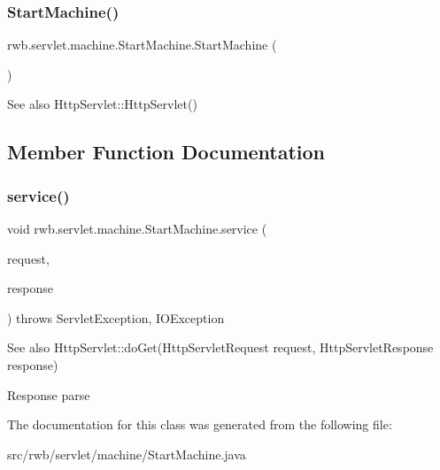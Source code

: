 \subsubsection{\texorpdfstring{Start\+Machine()}{StartMachine()}}
{\footnotesize\ttfamily rwb.\+servlet.\+machine.\+Start\+Machine.\+Start\+Machine (\begin{DoxyParamCaption}{ }\end{DoxyParamCaption})}

\begin{DoxySeeAlso}{See also}
Http\+Servlet\+::\+Http\+Servlet() 
\end{DoxySeeAlso}


\subsection{Member Function Documentation}
\mbox{\label{classrwb_1_1servlet_1_1machine_1_1_start_machine_a7ba18a7b31c09a940d6d2fd24b3fd711}} 
\subsubsection{\texorpdfstring{service()}{service()}}
{\footnotesize\ttfamily void rwb.\+servlet.\+machine.\+Start\+Machine.\+service (\begin{DoxyParamCaption}\item[{Http\+Servlet\+Request}]{request,  }\item[{Http\+Servlet\+Response}]{response }\end{DoxyParamCaption}) throws Servlet\+Exception, I\+O\+Exception\hspace{0.3cm}{\ttfamily [protected]}}

\begin{DoxySeeAlso}{See also}
Http\+Servlet\+::do\+Get(\+Http\+Servlet\+Request request, Http\+Servlet\+Response response) 
\end{DoxySeeAlso}
Response parse

The documentation for this class was generated from the following file\+:\begin{DoxyCompactItemize}
\item 
src/rwb/servlet/machine/Start\+Machine.\+java\end{DoxyCompactItemize}
